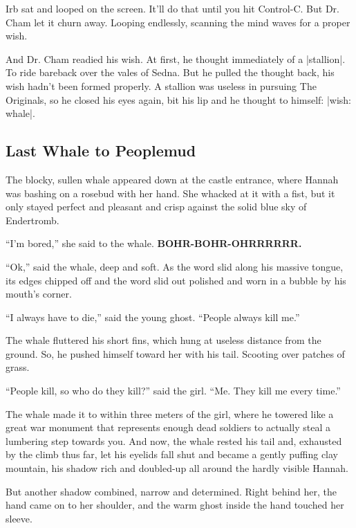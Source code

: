\documentclass[12pt,twoside]{report}
\begin{document}
Irb sat and looped on the screen.  It'll do that until you hit
Control-C.  But Dr. Cham let it churn away.  Looping endlessly,
scanning the mind waves for a proper wish.

And Dr. Cham readied his wish.  At first, he thought immediately of a
\rubyinline|stallion|.  To ride bareback over the
vales of Sedna.  But he pulled the thought back, his wish hadn't been
formed properly. A stallion was useless in pursuing The Originals, so
he closed his eyes again, bit his lip and he thought to himself:
\rubyinline|wish: whale|.



\subsection{Last Whale to Peoplemud}



The blocky, sullen whale appeared down at the castle entrance, where
Hannah was bashing on a rosebud with her hand.  She whacked at it with
a fist, but it only stayed perfect and pleasant and crisp against the
solid blue sky of Endertromb.

``I'm bored,'' she said to the whale.  {\bf BOHR-BOHR-OHRRRRRR.}

``Ok,'' said the whale, deep and soft.  As the word slid along his
massive tongue, its edges chipped off and the word slid out polished
and worn in a bubble by his mouth's corner.

``I always have to die,'' said the young ghost.  ``People always kill
me.''

The whale fluttered his short fins, which hung at useless distance
from the ground. So, he pushed himself toward her with his tail.
Scooting over patches of grass.

``People kill, so who do they kill?'' said the girl.  ``Me.  They kill
me every time.''

The whale made it to within three meters of the girl, where he towered
like a great war monument that represents enough dead soldiers to
actually steal a lumbering step towards you.  And now, the whale
rested his tail and, exhausted by the climb thus far, let his eyelids
fall shut and became a gently puffing clay mountain, his shadow rich
and doubled-up all around the hardly visible Hannah.

But another shadow combined, narrow and determined.  Right behind her,
the hand came on to her shoulder, and the warm ghost inside the hand
touched her sleeve.
\end{document}
